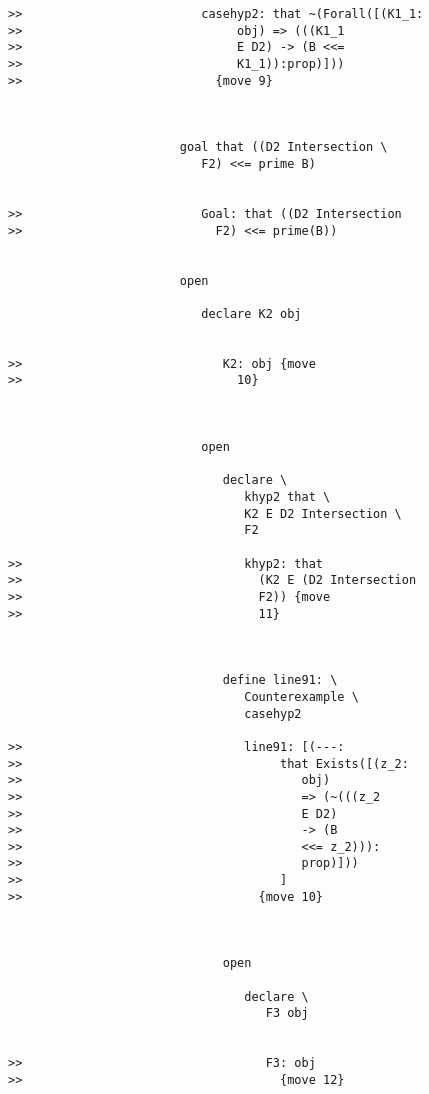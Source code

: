 \documentclass[12pt]{article}
\begin{document}
\begin{verbatim}
>>                         casehyp2: that ~(Forall([(K1_1:
>>                              obj) => (((K1_1
>>                              E D2) -> (B <<=
>>                              K1_1)):prop)]))
>>                           {move 9}



                        goal that ((D2 Intersection \
                           F2) <<= prime B)


>>                         Goal: that ((D2 Intersection
>>                           F2) <<= prime(B))


                        open

                           declare K2 obj


>>                            K2: obj {move
>>                              10}



                           open

                              declare \
                                 khyp2 that \
                                 K2 E D2 Intersection \
                                 F2

>>                               khyp2: that
>>                                 (K2 E (D2 Intersection
>>                                 F2)) {move
>>                                 11}



                              define line91: \
                                 Counterexample \
                                 casehyp2

>>                               line91: [(---:
>>                                    that Exists([(z_2:
>>                                       obj)
>>                                       => (~(((z_2
>>                                       E D2)
>>                                       -> (B
>>                                       <<= z_2))):
>>                                       prop)]))
>>                                    ]
>>                                 {move 10}



                              open

                                 declare \
                                    F3 obj


>>                                  F3: obj
>>                                    {move 12}




\end{verbatim}
\end{document}
